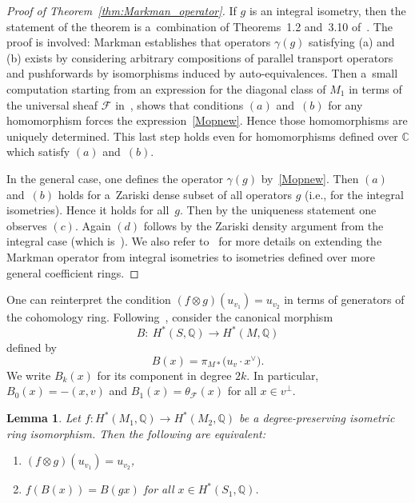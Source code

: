 \documentclass[pdftex]{sigma}
\numberwithin{equation}{section}
\newtheorem{Lemma}[Theorem]{Lemma}
\newcommand{\BC}{{\mathbb{C}}}
\newcommand{\BQ}{{\mathbb{Q}}}
\newcommand{\CF}{{\mathcal F}}
\newcommand{\1}{\mathsf{1}}
\begin{document}
\begin{proof}[Proof of Theorem~\ref{thm:Markman_operator}]
If $g$ is an integral isometry, then the
statement of the theorem is a~combination
of Theorems~1.2 and~3.10 of~\cite{Markman}.
The proof is involved: Markman establishes that operators $\gamma(g)$ satisfying (a) and (b) exists
by considering arbitrary compositions of parallel transport operators and pushforwards by isomorphisms induced by auto-equivalences.
Then a~small computation starting from an expression for the diagonal class of $M_1$ in terms of the universal sheaf $\CF$ in~\cite{MarkmanGenerators},
shows that conditions $(a)$ and~$(b)$ for any homomorphism forces the expression~\eqref{Mopnew}.
Hence those homomorphisms are uniquely determined.
This last step holds even for homomorphisms defined over $\BC$ which satisfy $(a)$ and~$(b)$.

In the general case, one defines the operator $\gamma(g)$ by~\eqref{Mopnew}.
Then $(a)$ and~$(b)$ holds for a~Zariski dense subset of all operators $g$ (i.e., for the integral isometries).
Hence it holds for all~$g$. Then by the uniqueness statement one observes $(c)$. Again $(d)$ follows by the Zariski density argument from the integral case
(which is~\cite[Theorem~1.2(6)]{Markman}).
We also refer to~\cite[Proposition 5.1]{Frei} for more details on extending the Markman operator from integral isometries to isometries defined over more general coefficient rings.
\end{proof}
One can reinterpret the condition $(f \otimes g)(u_{v_1}) = u_{v_2}$ in terms of generators of the cohomology ring.
Following~\cite[equation~(3.23)]{Markman}, consider the canonical morphism
\[
B \colon \ H^{\ast}(S,\BQ) \to H^{\ast}(M,\BQ)
\]
defined by
\[
B(x) = \pi_{M \ast}\big( u_{v} \cdot x^{\vee} \big).
\]
We write $B_k(x)$ for its component in degree $2k$. In particular,
$B_0(x) = -(x,v)$ and
$B_1(x) = \theta_{\CF}(x)$ for all $x \in v^{\perp}$.


\begin{Lemma} %
Let $f \colon H^{\ast}(M_1, \BQ) \to H^{\ast}(M_2, \BQ)$ be a degree-preserving isometric ring isomorphism.
Then the following are equivalent:
\begin{enumerate}
\item[$(a)$] $(f \otimes g)(u_{v_1}) = u_{v_2}$,
\item[$(b)$] $f(B(x)) = B(gx)$ for all $x \in H^{\ast}(S_1,\BQ)$.
\end{enumerate}
\end{Lemma}
\end{document}
